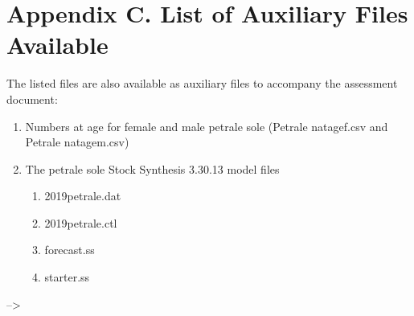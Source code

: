 \documentclass[12pt,]{article}
\begin{document}
\section{Appendix C. List of Auxiliary Files
Available}\label{appendix-c.-list-of-auxiliary-files-available}

The listed files are also available as auxiliary files to accompany the
assessment document:

\begin{enumerate}
  \item Numbers at age for female and male petrale sole (Petrale natagef.csv and Petrale natagem.csv)
  \item The petrale sole Stock Synthesis 3.30.13 model files
  
  \begin{enumerate}
    \item 2019petrale.dat
    \item 2019petrale.ctl
    \item forecast.ss
    \item starter.ss
  \end{enumerate}
\end{enumerate}

\newpage

--\textgreater{}
\end{document}
